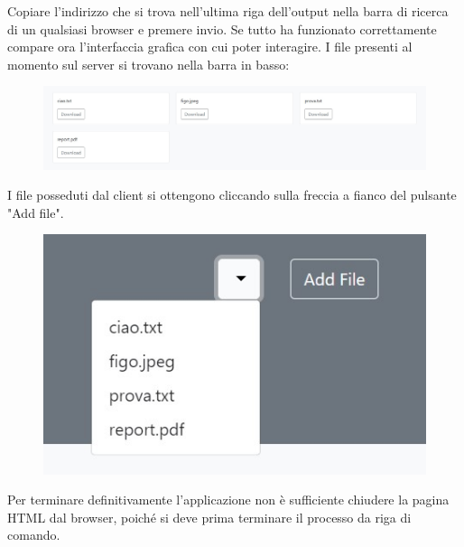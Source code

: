 \documentclass[a4paper,12pt]{report}
\begin{document}
Copiare l'indirizzo che si trova nell'ultima riga dell'output nella barra di ricerca di un qualsiasi browser e premere invio. Se tutto ha funzionato correttamente compare ora l'interfaccia grafica con cui poter interagire. I file presenti al momento sul server si trovano nella barra in basso:
\begin{figure}[H]
    \centering
    \includegraphics[width=\textwidth]{img/gui_1.jpg}
\end{figure}

I file posseduti dal client si ottengono cliccando sulla freccia a fianco del pulsante "Add file".
\begin{figure}[H]
    \centering
    \includegraphics[scale=0.8]{img/gui_2.jpg}
\end{figure}

Per terminare definitivamente l'applicazione non è sufficiente chiudere la pagina HTML dal browser, poiché si deve prima terminare il processo da riga di comando.
\end{document}
